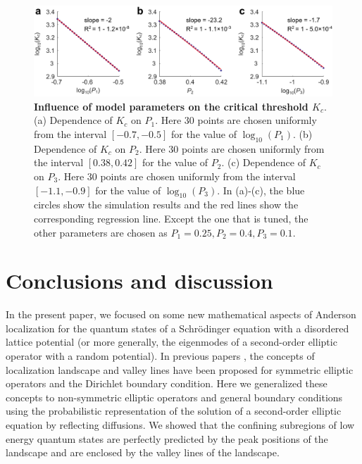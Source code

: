 \documentclass[a4paper,11pt]{article}
\begin{document}
\begin{figure}
\centering
\includegraphics[width=\linewidth]{Fig6}
\caption{\textbf{Influence of model parameters on the critical threshold $K_c$}. (a) Dependence of $K_c$ on $P_1$. Here 30 points are chosen uniformly from the interval $[-0.7,-0.5]$ for the value of $\log_{10}(P_1)$. (b) Dependence of $K_c$ on $P_2$. Here 30 points are chosen uniformly from the interval $[0.38,0.42]$ for the value of $P_2$. (c) Dependence of $K_c$ on $P_3$. Here 30 points are chosen uniformly from the interval $[-1.1,-0.9]$ for the value of $\log_{10}(P_3)$. In (a)-(c), the blue circles show the simulation results and the red lines show the corresponding regression line. Except the one that is tuned, the other parameters are chosen as $P_1 = 0.25, P_2 = 0.4, P_3 = 0.1$.}
\label{fig6}
\end{figure}


\section{Conclusions and discussion}\label{conclusion}
In the present paper, we focused on some new mathematical aspects of Anderson localization for the quantum states of a Schr\"{o}dinger equation with a disordered lattice potential (or more generally, the eigenmodes of a second-order elliptic operator with a random potential). In previous papers \cite{filoche2012universal}, the concepts of localization landscape and valley lines have been proposed  for symmetric elliptic operators and the Dirichlet boundary condition. Here we generalized these concepts to non-symmetric elliptic operators and general boundary conditions using the probabilistic representation of the solution of a second-order elliptic equation by reflecting diffusions. We showed that the confining subregions of low energy quantum states are perfectly predicted by the peak positions of the landscape and are enclosed by the valley lines of the landscape.
\end{document}
